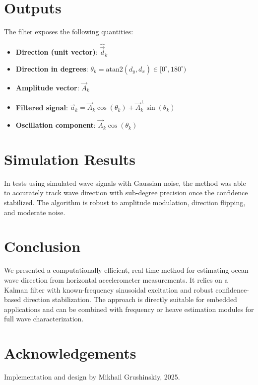 \documentclass[12pt]{article}
\begin{document}
\section{Outputs}

The filter exposes the following quantities:
\begin{itemize}
  \item \textbf{Direction (unit vector)}: \( \hat{\vec{d}}_k \)
  \item \textbf{Direction in degrees}: \( \theta_k = \text{atan2}(d_y, d_x) \in [0^\circ, 180^\circ) \)
  \item \textbf{Amplitude vector}: \( \vec{A}_k \)
  \item \textbf{Filtered signal}: \( \vec{a}_k = \vec{A}_k \cos(\theta_k) + \vec{A}_k^\perp \sin(\theta_k) \)
  \item \textbf{Oscillation component}: \( \vec{A}_k \cos(\theta_k) \)
\end{itemize}

\section{Simulation Results}

In tests using simulated wave signals with Gaussian noise, the method was able to accurately track wave direction with sub-degree precision once the confidence stabilized. The algorithm is robust to amplitude modulation, direction flipping, and moderate noise.

\section{Conclusion}

We presented a computationally efficient, real-time method for estimating ocean wave direction from horizontal accelerometer measurements. It relies on a Kalman filter with known-frequency sinusoidal excitation and robust confidence-based direction stabilization. The approach is directly suitable for embedded applications and can be combined with frequency or heave estimation modules for full wave characterization.

\section*{Acknowledgements}
Implementation and design by Mikhail Grushinskiy, 2025.
\end{document}
